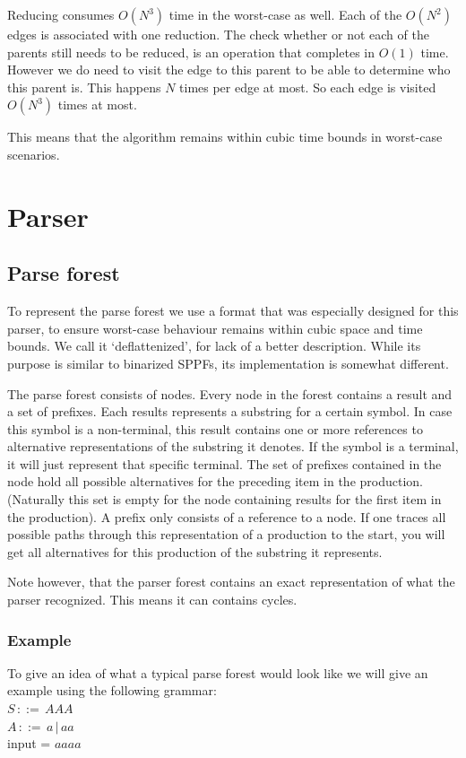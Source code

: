 \documentclass[a4paper,10pt]{article}
\begin{document}
Reducing consumes $O(N^3)$ time in the worst-case as well. Each of the $O(N^2)$ edges is associated with one reduction. The check whether or not each of the parents still needs to be reduced, is an operation that completes in $O(1)$ time. However we do need to visit the edge to this parent to be able to determine who this parent is. This happens $N$ times per edge at most. So each edge is visited $O(N^3)$ times at most.

This means that the algorithm remains within cubic time bounds in worst-case scenarios.

\section{Parser}

\subsection{Parse forest}

To represent the parse forest we use a format that was especially designed for this parser, to ensure worst-case behaviour remains within cubic space and time bounds. We call it `deflattenized', for lack of a better description. While its purpose is similar to binarized SPPFs, its implementation is somewhat different.

The parse forest consists of nodes. Every node in the forest contains a result and a set of prefixes. Each results represents a substring for a certain symbol. In case this symbol is a non-terminal, this result contains one or more references to alternative representations of the substring it denotes. If the symbol is a terminal, it will just represent that specific terminal. The set of prefixes contained in the node hold all possible alternatives for the preceding item in the production. (Naturally this set is empty for the node containing results for the first item in the production). A prefix only consists of a reference to a node. If one traces all possible paths through this representation of a production to the start, you will get all alternatives for this production of the substring it represents.

Note however, that the parser forest contains an exact representation of what the parser recognized. This means it can contains cycles.

\subsubsection{Example}
To give an idea of what a typical parse forest would look like we will give an example using the following grammar:\\
$S\,::=\,AAA$\\
$A\,::=\,a\,|\,aa$\\
input = $aaaa$
\end{document}
